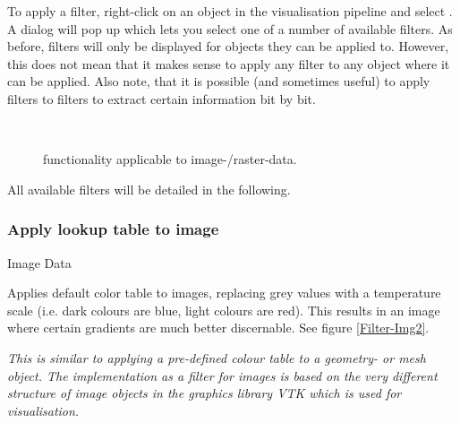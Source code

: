 To apply a filter, right-click on an object in the visualisation pipeline and select . A dialog will pop up which lets you select one of a number of available filters. As before, filters will only be displayed for objects they can be applied to. However, this does not mean that it makes sense to apply any filter to any object where it can be applied. Also note, that it is possible (and sometimes useful) to apply filters to filters to extract certain information bit by bit.
%
\begin{figure}[tb]
\begin{center}
\enspace
{} \\
\enspace
{}
\end{center}
\caption{\ogs functionality applicable to image-/raster-data.} \label{fig:filter:raster}
\end{figure}
%
All available filters will be detailed in the following.

\subsubsection{Apply lookup table to image}
 Image Data

 Applies default color table to images, replacing grey values with a temperature scale (i.e. dark colours are blue, light colours are red). This results in an image where certain gradients are much better discernable. See figure \ref{Filter-Img2}.

 \emph{This is similar to applying a pre-defined colour table to a geometry- or mesh object. The implementation as a filter for images is based on the very different structure of image objects in the graphics library VTK which is used for visualisation.}

